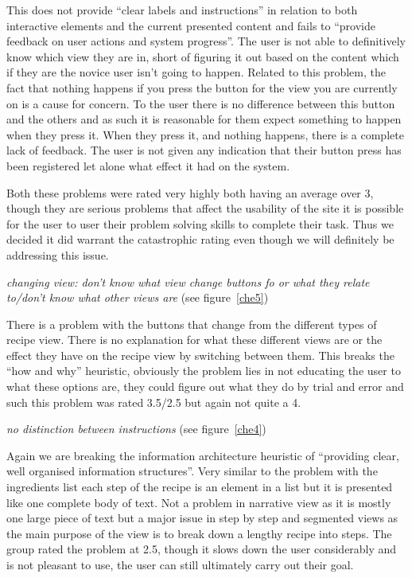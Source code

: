 This does not provide “clear labels and instructions” in relation to both interactive elements and the current presented content and fails to “provide feedback on user actions and system progress”. The user is not able to definitively know which view they are in, short of figuring it out based on the content which if they are the novice user isn’t going to happen. Related to this problem, the fact that nothing happens if you press the button for the view you are currently on is a cause for concern. To the user there is no difference between this button and the others and as such it is reasonable for them expect something to happen when they press it. When they press it, and nothing happens, there is a complete lack of feedback. The user is not given any indication that their button press has been registered let alone what effect it had on the system. 

Both these problems were rated very highly both having an average over 3, though they are serious problems that affect the usability of the site it is possible for the user to user their problem solving skills to complete their task. Thus we decided it did warrant the catastrophic rating even though we will definitely be addressing this issue.

\begin{center}
  \emph{changing view: don't know what view change buttons fo or what they relate to/don't know what other views are} (see figure~\ref{che5})
\end{center}
There is a problem with the buttons that change from the different types of recipe view. There is no explanation for what these different views are or the effect they have on the recipe view by switching between them. This breaks the “how and why” heuristic, obviously the problem lies in not educating the user to what these options are, they could figure out what they do by trial and error and such this problem was rated 3.5/2.5 but again not quite a 4. 

\begin{center}
  \emph{no distinction between instructions} (see figure~\ref{che4})
\end{center}
Again we are breaking the information architecture heuristic of “providing clear, well organised information structures”. Very similar to the problem with the ingredients list each step of the recipe is an element in a list but it is presented like one complete body of text. Not a problem in narrative view as it is mostly one large piece of text but a major issue in step by step and segmented views as the main purpose of the view is to break down a lengthy recipe into steps. The group rated the problem at 2.5, though it slows down the user considerably and is not pleasant to use, the user can still ultimately carry out their goal.

